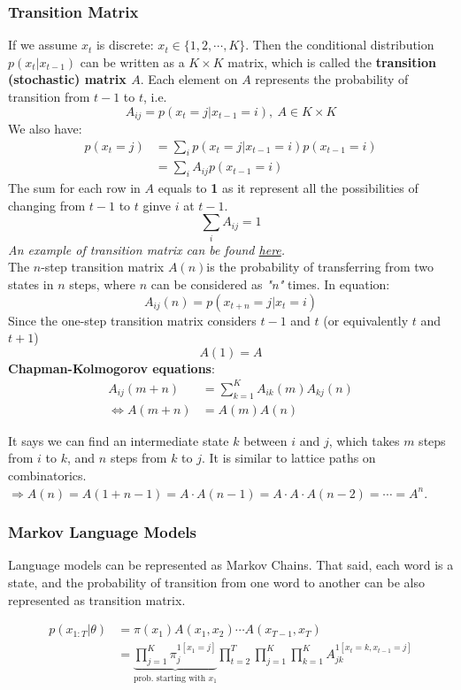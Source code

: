 \subsubsection*{Transition Matrix}
If we assume $x_t$ is discrete: $x_t\in\{1,2,\cdots,K\}$. Then the conditional distribution $p(x_t|x_{t-1})$ can be written as a $K\times K$ matrix, which is called the \textbf{transition (stochastic) matrix $A$}. Each element on $A$ represents the probability of transition from $t-1$ to $t$, i.e.
$$A_{ij}=p(x_t=j|x_{t-1}=i),\:A\in K\times K$$
We also have:
\begin{align*} 
    p\left(x_t=j\right) & =\sum_i p\left(x_t=j | x_{t-1}=i\right) p\left(x_{t-1}=i\right) \\ 
    & =\sum_i A_{i j} p\left(x_{t-1}=i\right)
\end{align*}
The sum for each row in $A$ equals to \textbf{1} as it represent all the possibilities of changing from $t-1$ to $t$ ginve $i$ at $t-1$.
$$\sum_i A_{i j}=1$$
\textit{An example of transition matrix can be found \hyperref[fig:transition-example]{here}.}\\
The $n$-step transition matrix $A(n)$is the probability of transferring from two states in $n$ steps, where $n$ can be considered as \textit{"n"} times. In equation:
$$
A_{i j}(n)=p\left(x_{t+n}=j | x_t=i\right)
$$
Since the one-step transition matrix considers $t-1$ and $t$ (or equivalently $t$ and $t+1$)
$$A(1)=A$$
\textbf{Chapman-Kolmogorov equations}:
\begin{align*}
    A_{i j}(m+n)&=\sum_{k=1}^K A_{i k}(m) A_{k j}(n)\\
    \Leftrightarrow A(m+n)&=A(m) A(n)
\end{align*}

It says we can find an intermediate state $k$ between $i$ and $j$, which takes $m$ steps from $i$ to $k$, and $n$ steps from $k$ to $j$. It is similar to lattice paths on combinatorics.\\
$\Rightarrow A(n)=A(1+n-1)=A \cdot A(n-1)=A \cdot A \cdot A(n-2)=\cdots=A^n$.

\subsubsection*{Markov Language Models}
Language models can be represented as Markov Chains. That said, each word is a state, and the probability of transition from one word to another can be also represented as transition matrix.

\begin{align*} 
    p\left(x_{1: T} | \theta\right) & =\pi\left(x_1\right) A\left(x_1, x_2\right) \cdots A\left(x_{T-1}, x_T\right) \\
    & =\underbrace{\prod_{j=1}^K \pi_j^{1\left[x_1=j\right]}}_{\text{prob. starting with }x_1} \prod_{t=2}^T \prod_{j=1}^K \prod_{k=1}^K A_{j k}^{1\left[x_t=k, x_{t-1}=j\right]}
\end{align*}

